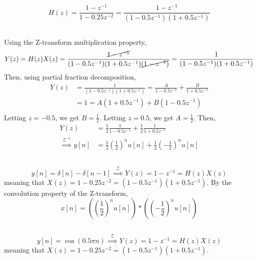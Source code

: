 \documentclass{article}
\begin{document}
\newpage
\section{}

\begin{equation}
    H(z) = \frac{1 - z^{-1}}{1 - 0.25z^{-2}} = \frac{1 - z^{-1}}{(1 - 0.5z^{-1}) (1 + 0.5z^{-1})}
\end{equation}

\subsection{}

Using the Z-transform multiplication property,
\begin{equation}
    Y(z) = H(z) X(z) = \frac{\cancel{1 - z^{-1}}}{(1 - 0.5z^{-1}) (1 + 0.5z^{-1}) \cancel{(1 - z^{-1})}} = \frac{1}{(1 - 0.5z^{-1}) (1 + 0.5z^{-1})}
\end{equation}
Then, using partial fraction decomposition,
\begin{align}
    Y(z) &= \frac{1}{(1 - 0.5z^{-1}) (1 + 0.5z^{-1})} = \frac{A}{1 - 0.5z^{-1}} + \frac{B}{1 + 0.5z^{-1}} \\
    &= 1 = A(1 + 0.5z^{-1}) + B(1 - 0.5z^{-1}) \\
\end{align}
Letting \(z = -0.5\), we get \(B = \frac{1}{2}\).
Letting \(z = 0.5\), we get \(A = \frac{1}{2}\).
Then,
\begin{align}
    Y(z) &= \frac{1}{2} \frac{1}{1 - 0.5z^{-1}} + \frac{1}{2} \frac{1}{1 + 0.5z^{-1}} \\
    \overset{\mathcal{Z}^{-1}}{\implies} y[n] &= \frac{1}{2} \left(\frac{1}{2}\right)^n u[n] + \frac{1}{2} \left(-\frac{1}{2}\right)^n u[n]
\end{align}

\subsection{}

\begin{equation}
    y[n] = \delta[n] - \delta[n - 1] \overset{\mathcal{Z}}{\implies} Y(z) = 1 - z^{-1} = H(z) X(z)
\end{equation}
meaning that \(X(z) = 1 - 0.25z^{-2} = (1 - 0.5z^{-1}) (1 + 0.5z^{-1})\).
By the convolution property of the Z-transform,
\begin{equation}
    x[n] = \left(\left(\frac{1}{2}\right)^n u[n]\right) \ast \left(\left(-\frac{1}{2}\right)^n u[n]\right)
\end{equation}

\subsection{}

\begin{equation}
    y[n] = \cos(0.5\pi n) \overset{\mathcal{Z}}{\implies} Y(z) = 1 - z^{-1} = H(z) X(z)
\end{equation}
meaning that \(X(z) = 1 - 0.25z^{-2} = (1 - 0.5z^{-1}) (1 + 0.5z^{-1})\).
\end{document}
